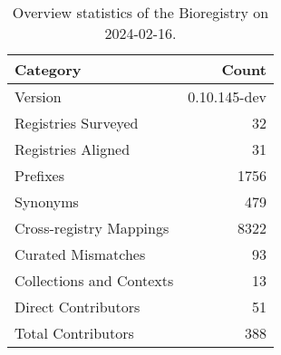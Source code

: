 \begin{table}
\caption{Overview statistics of the Bioregistry on 2024-02-16.}
\label{tab:bioregistry-summary}
\begin{tabular}{lr}
\toprule
Category & Count \\
\midrule
Version & 0.10.145-dev \\
Registries Surveyed & 32 \\
Registries Aligned & 31 \\
Prefixes & 1756 \\
Synonyms & 479 \\
Cross-registry Mappings & 8322 \\
Curated Mismatches & 93 \\
Collections and Contexts & 13 \\
Direct Contributors & 51 \\
Total Contributors & 388 \\
\bottomrule
\end{tabular}
\end{table}
